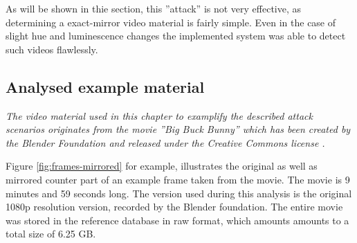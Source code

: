 As will be shown in thie section, this ''attack'' is not very effective, as determining a exact-mirror video material is fairly simple. Even in the case of slight hue and luminescence changes the implemented system was able to detect such videos flawlessly.

\subsection{Analysed example material}
\textit{The video material used in this chapter to examplify the described attack scenarios originates from the movie ''\textit{Big Buck Bunny}'' \cite{big-buck-bunny} which has been created by the Blender Foundation \cite{blender-foundation} and released under the Creative Commons license \cite{creative-commons}.}

Figure \ref{fig:frames-mirrored} for example, illustrates the original as well as mirrored counter part of an example frame taken from the movie. The movie is 9 minutes and 59 seconds long. The version used during this analysis is the original 1080p resolution version, recorded by the Blender foundation. The entire movie was stored in the reference database in raw format, which amounts amounts to a total size of 6.25 GB.


